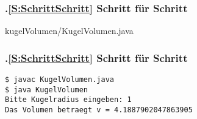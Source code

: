 \def\stitle{Schritt f\"ur Schritt}%
\begin{frame}[t]%
  \frametitle{\kap.\ref{S:SchrittSchritt} \stitle}%
\medskip


{kugelVolumen/KugelVolumen.java}

\end{frame}


\def\stitle{Schritt f\"ur Schritt}%
\begin{frame}[fragile]%
  \frametitle{\kap.\ref{S:SchrittSchritt} \stitle}%
\medskip

\begin{lstlisting}[title={Um das Programm \code{KugelVolumen} auszuf\"uhren werden folgende Schritte auf dem Terminal durchgef\"uhrt.},style=BASH]
$ javac KugelVolumen.java
$ java KugelVolumen
Bitte Kugelradius eingeben: 1
Das Volumen betraegt v = 4.1887902047863905
\end{lstlisting}

\end{frame}
